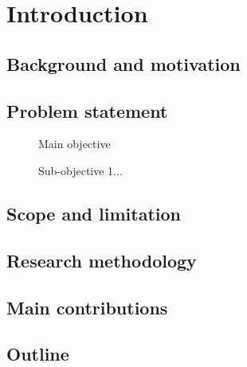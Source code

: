 \chapter{Introduction}\label{sec:intro}
\section{Background and motivation}

\section{Problem statement}
\begin{description}
	\item[] Main objective
	\item[] Sub-objective 1...
\end{description}

\section{Scope and limitation}

\section{Research methodology}

\section{Main contributions}

\section{Outline}
